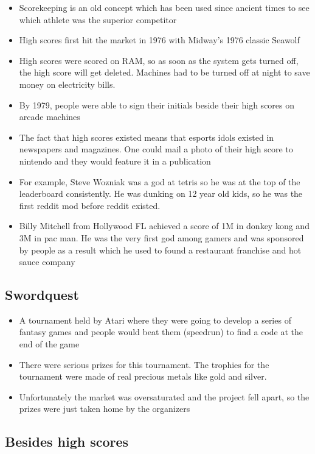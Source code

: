 \documentclass[12pt]{book}
\begin{document}
\begin{itemize}
    \item Scorekeeping is an old concept which has been used since ancient times to see which athlete was the superior competitor
    \item High scores first hit the market in 1976 with Midway's 1976 classic Seawolf
    \item High scores were scored on RAM, so as soon as the system gets turned off, the high score will get deleted. Machines had to be turned off at night to save money on electricity bills.
    \item By 1979, people were able to sign their initials beside their high scores on arcade machines
    \item The fact that high scores existed means that esports idols existed in newspapers and magazines. One could mail a photo of their high score to nintendo and they would feature it in a publication
    \item For example, Steve Wozniak was a god at tetris so he was at the top of the leaderboard consistently. He was dunking on 12 year old kids, so he was the first reddit mod before reddit existed.
    \item Billy Mitchell from Hollywood FL achieved a score of 1M in donkey kong and 3M in pac man. He was the very first god among gamers and was sponsored by people as a result which he used to found a restaurant franchise and hot sauce company
\end{itemize}

\subsection{Swordquest}

\begin{itemize}
    \item A tournament held by Atari where they were going to develop a series of fantasy games and people would beat them (speedrun) to find a code at the end of the game
    \item There were serious prizes for this tournament. The trophies for the tournament were made of real precious metals like gold and silver.
    \item Unfortunately the market was oversaturated and the project fell apart, so the prizes were just taken home by the organizers
\end{itemize}

\subsection{Besides high scores}
\end{document}
